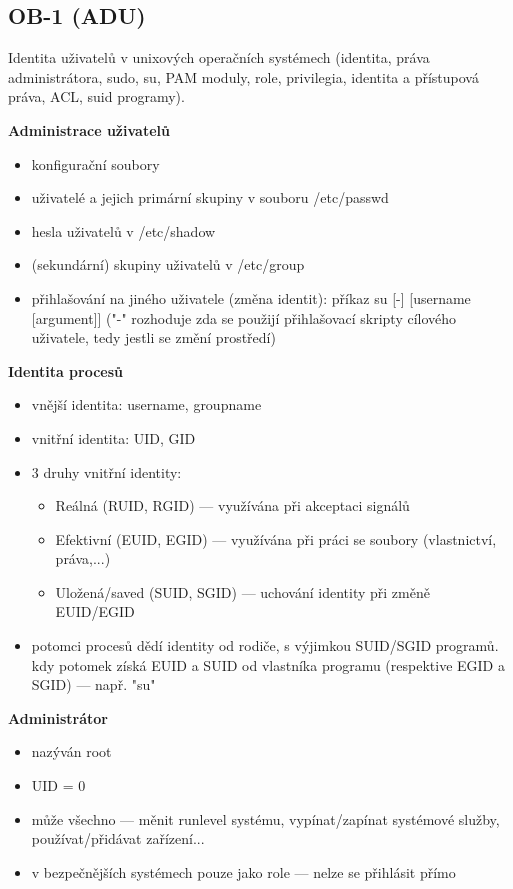 \subsection{OB-1 (ADU)}
Identita uživatelů v unixových operačních systémech (identita, práva administrátora, sudo, su, PAM moduly, role, privilegia, identita a přístupová práva, ACL, suid programy).

\textbf{Administrace uživatelů}
\begin{itemize}
	\item konfigurační soubory
	\item uživatelé a jejich primární skupiny v souboru /etc/passwd
	\item hesla uživatelů v /etc/shadow
	\item (sekundární) skupiny uživatelů v /etc/group
	\item přihlašování na jiného uživatele (změna identit): příkaz su [-] [username [argument]] ("-" rozhoduje zda se použijí při\-hla\-šo\-va\-cí skripty cílového uživatele, tedy jestli se změní prostředí)
\end{itemize}

\textbf{Identita procesů}
\begin{itemize}
	\item vnější identita: username, groupname
	\item vnitřní identita: UID, GID
	\item 3 druhy vnitřní identity:
	\begin{itemize}
		\item Reálná (RUID, RGID) --- využívána při akceptaci signálů
		\item Efektivní (EUID, EGID) --- využívána při práci se soubory (vlastnictví, práva,...)
		\item Uložená/saved (SUID, SGID) --- uchování identity při změně EUID/EGID
	\end{itemize}
	\item potomci procesů dědí identity od rodiče, s výjimkou SUID/SGID programů. kdy potomek získá EUID a SUID od vlastníka programu (respektive EGID a SGID) --- např. "su"
\end{itemize}

\textbf{Administrátor}
\begin{itemize}
	\item nazýván root
	\item UID = 0
	\item může všechno --- měnit runlevel systému, vypínat/zapínat systémové služby, používat/přidávat zařízení...
	\item v bezpečnějších systémech pouze jako role --- nelze se přihlásit přímo
\end{itemize}


